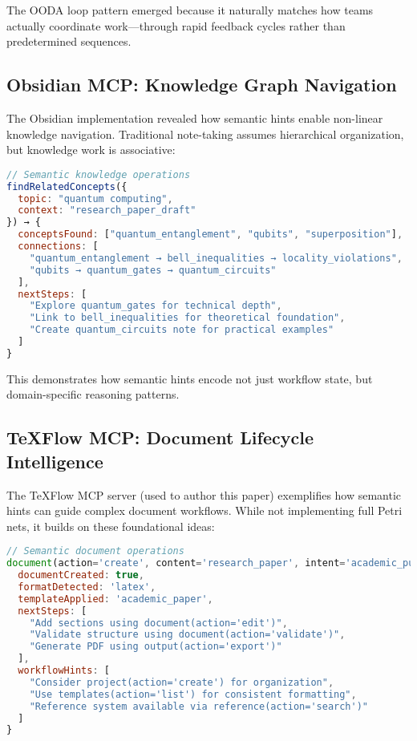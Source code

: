 \documentclass[11pt,a4paper]{article}
\begin{document}
The OODA loop pattern emerged because it naturally matches how teams actually coordinate work—through rapid feedback cycles rather than predetermined sequences.

\subsection{Obsidian MCP: Knowledge Graph Navigation}

The Obsidian implementation revealed how semantic hints enable non-linear knowledge navigation. Traditional note-taking assumes hierarchical organization, but knowledge work is associative:

\begin{lstlisting}[language=JavaScript]
// Semantic knowledge operations
findRelatedConcepts({
  topic: "quantum computing",
  context: "research_paper_draft"
}) → {
  conceptsFound: ["quantum_entanglement", "qubits", "superposition"],
  connections: [
    "quantum_entanglement → bell_inequalities → locality_violations",
    "qubits → quantum_gates → quantum_circuits"
  ],
  nextSteps: [
    "Explore quantum_gates for technical depth",
    "Link to bell_inequalities for theoretical foundation",
    "Create quantum_circuits note for practical examples"
  ]
}
\end{lstlisting}

This demonstrates how semantic hints encode not just workflow state, but domain-specific reasoning patterns.

\subsection{TeXFlow MCP: Document Lifecycle Intelligence}

The TeXFlow MCP server (used to author this paper) exemplifies how semantic hints can guide complex document workflows. While not implementing full Petri nets, it builds on these foundational ideas:

\begin{lstlisting}[language=JavaScript]
// Semantic document operations
document(action='create', content='research_paper', intent='academic_publication') → {
  documentCreated: true,
  formatDetected: 'latex',
  templateApplied: 'academic_paper',
  nextSteps: [
    "Add sections using document(action='edit')",
    "Validate structure using document(action='validate')",
    "Generate PDF using output(action='export')"
  ],
  workflowHints: [
    "Consider project(action='create') for organization",
    "Use templates(action='list') for consistent formatting",
    "Reference system available via reference(action='search')"
  ]
}
\end{lstlisting}
\end{document}
